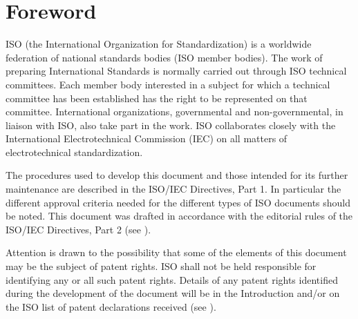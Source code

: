 \chapter{Foreword}

ISO (the International Organization for Standardization)
is a worldwide federation of national standards bodies (ISO member bodies).
The work of preparing International Standards
is normally carried out through ISO technical committees.
Each member body interested in a subject
for which a technical committee has been established
has the right to be represented on that committee.
International organizations,
governmental and non-governmental,
in liaison with ISO,
also take part in the work.
ISO collaborates closely with
the International Electrotechnical Commission (IEC)
on all matters of electrotechnical standardization.


The procedures used to develop this document and those intended for its further
maintenance are described in the ISO/IEC Directives, Part 1. In particular the
different approval criteria needed for the different types of ISO documents should
be noted. This document was drafted in accordance with the editorial rules of
the ISO/IEC Directives, Part 2
(see \href{http://www.iso.org/directives}{}).

Attention is drawn to the possibility that some of the elements of this
document may be the subject of patent rights. ISO shall not be held
responsible for identifying any or all such patent rights. Details of any
patent rights identified during the development of the document will be in the
Introduction and/or on the ISO list of patent declarations received
(see \href{http://www.iso.org/patents}{}).

